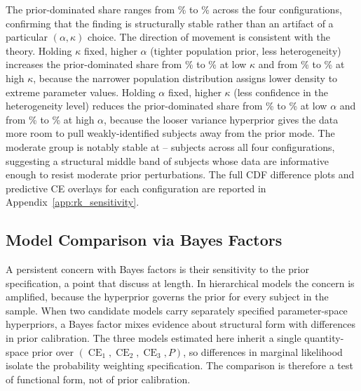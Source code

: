 \documentclass[12pt,a4paper]{article}
\theoremstyle{definition}
\theoremstyle{remark}
\DeclareMathOperator{\CE}{CE}
\begin{document}
The prior-dominated share ranges from \% to \%
across the four configurations, confirming that the finding is structurally
stable rather than an artifact of a particular $(\alpha, \kappa)$ choice. The
direction of movement is consistent with the theory. Holding $\kappa$ fixed,
higher $\alpha$ (tighter population prior, less heterogeneity) increases the
prior-dominated share from \% to \% at low
$\kappa$ and from \% to \% at high $\kappa$,
because the narrower population distribution assigns lower density to extreme
parameter values. Holding $\alpha$ fixed, higher $\kappa$ (less confidence in
the heterogeneity level) reduces the prior-dominated share from
\% to \% at low $\alpha$ and from
\% to \% at high $\alpha$, because the looser
variance hyperprior gives the data more room to pull weakly-identified subjects
away from the prior mode.
The moderate group is notably stable at -- subjects
across all four
configurations, suggesting a structural middle band of subjects whose data are
informative enough to resist moderate prior perturbations. The full CDF
difference plots and predictive CE overlays for each configuration are reported
in Appendix~\ref{app:rk_sensitivity}.

\subsection{Model Comparison via Bayes Factors}
\label{sec:model_comparison}

A persistent concern with Bayes factors is their sensitivity to the prior
specification, a point that \textcite{KassRaftery1995} discuss at length. In
hierarchical models the concern is amplified, because the hyperprior governs
the prior for every subject in the sample. When two candidate models carry
separately specified parameter-space hyperpriors, a Bayes factor mixes
evidence about structural form with differences in prior calibration. The
three models estimated here inherit a single quantity-space prior over
$(\CE_1, \CE_2, \CE_3, P)$, so differences in marginal likelihood isolate the
probability weighting specification. The comparison is therefore a test of
functional form, not of prior calibration.
\end{document}
